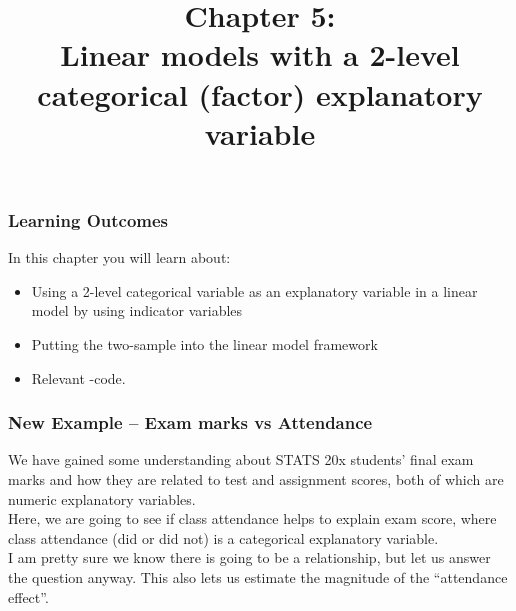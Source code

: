 \documentclass{beamer}\usepackage[]{graphicx}\usepackage[]{xcolor}
\begin{document}
\newcommand{\thechapter}{5}



\title{Chapter 5: \\ Linear models with a 2-level categorical (factor) explanatory variable}

\begin{frame}
\titlepage
\end{frame}

\begin{frame}[t]
\frametitle{Learning Outcomes}
In this chapter you will learn about:
\begin{center}
\vspace{16pt}
\begin{minipage}{0.9\textwidth}
  \begin{itemize}
  \item Using a 2-level categorical variable as an explanatory variable in a linear model by using indicator variables
  \item Putting the two-sample \ttest{} into the linear model framework
  \item Relevant -code.
  \end{itemize}
\end{minipage}
\end{center}
\end{frame}





\begin{frame}
\frametitle{New Example -- Exam marks vs Attendance}

We have gained some understanding about STATS 20x students' final exam marks and
how they are related to test and assignment scores, both of which are numeric explanatory variables.\\
\bigskip
Here, we are going to see if class attendance helps to explain exam score,
where class attendance (did or did not) is a categorical explanatory variable.\\
\bigskip
I am pretty sure we know there is going to be a relationship, but let us answer the question anyway.
This also lets us estimate the magnitude of the ``attendance effect''.
\end{frame}
\end{document}
